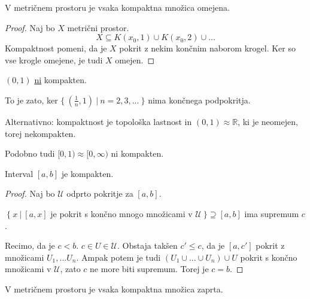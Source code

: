 \documentclass[11pt, a4paper]{article}
\begin{document}
    \begin{proposition}
        V metričnem prostoru je vsaka kompaktna množica omejena.
    \end{proposition}

    \begin{proof}
        Naj bo \(X\) metrični prostor.
        \[X \subseteq K(x_0,1) \cup K(x_0,2) \cup ... \]
        Kompaktnost pomeni, da je \(X\) pokrit z nekim končnim naborom krogel. Ker so vse krogle omejene, je tudi \(X\) omejen. 
    \end{proof}

    \begin{example}
        \((0,1)\) \underline{ni} kompakten.
        \par
        To je zato, ker \(\{\ (\frac{1}{n},1)\ |\ n=2,3,...\ \}\) nima končnega podpokritja.
        \par
        Alternativno: kompaktnost je topološka lastnost in \((0,1) \approx \mathbb{R}\), ki je neomejen, torej nekompakten.
        \par
        Podobno tudi \([0,1) \approx [0,\infty)\) ni kompakten.
    \end{example}

    \begin{theorem}
        Interval \([a,b]\) je kompakten.
    \end{theorem}

    \begin{proof}
        Naj bo \(\mathscr{U}\) odprto pokritje za \([a,b]\).
        \par
        \(\ \{\ x\ |\ [a,x]\) je pokrit s končno mnogo množicami v \(\mathscr{U}\ \} \supseteq [a,b]\) ima supremum \(c\).
        \par
        Recimo, da je \(c < b\). \(c \in U \in \mathscr{U}\). Obstaja takšen \(c' \le c\), da je \([a,c']\) pokrit z množicami \(U_1,...U_n\). Ampak potem je tudi \((U_1 \cup ... \cup U_n) \cup U\) pokrit s končno množicami v \(\mathscr{U}\), zato \(c\) ne more biti supremum. Torej je \(c = b\).
    \end{proof}

    \begin{theorem}
        V metričnem prostoru je vsaka kompaktna množica zaprta.
    \end{theorem}
\end{document}
